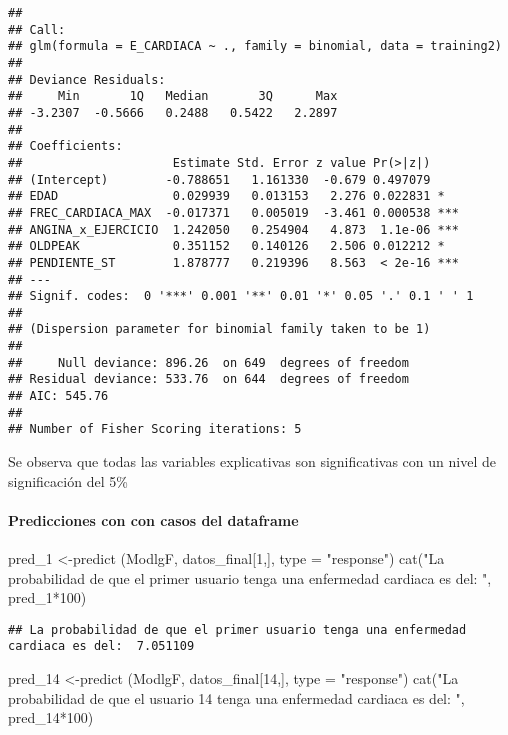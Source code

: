 \documentclass[
]{article}
\newenvironment{Shaded}{\begin{snugshade}}{\end{snugshade}}
\newcommand{\AttributeTok}[1]{\textcolor[rgb]{0.80,0.80,0.80}{#1}}
\newcommand{\DecValTok}[1]{\textcolor[rgb]{0.86,0.86,0.80}{#1}}
\newcommand{\FunctionTok}[1]{\textcolor[rgb]{0.94,0.94,0.56}{#1}}
\newcommand{\NormalTok}[1]{\textcolor[rgb]{0.80,0.80,0.80}{#1}}
\newcommand{\OtherTok}[1]{\textcolor[rgb]{0.94,0.94,0.56}{#1}}
\newcommand{\SpecialCharTok}[1]{\textcolor[rgb]{0.86,0.64,0.64}{#1}}
\newcommand{\StringTok}[1]{\textcolor[rgb]{0.80,0.58,0.58}{#1}}
\begin{document}
\begin{verbatim}
## 
## Call:
## glm(formula = E_CARDIACA ~ ., family = binomial, data = training2)
## 
## Deviance Residuals: 
##     Min       1Q   Median       3Q      Max  
## -3.2307  -0.5666   0.2488   0.5422   2.2897  
## 
## Coefficients:
##                     Estimate Std. Error z value Pr(>|z|)    
## (Intercept)        -0.788651   1.161330  -0.679 0.497079    
## EDAD                0.029939   0.013153   2.276 0.022831 *  
## FREC_CARDIACA_MAX  -0.017371   0.005019  -3.461 0.000538 ***
## ANGINA_x_EJERCICIO  1.242050   0.254904   4.873  1.1e-06 ***
## OLDPEAK             0.351152   0.140126   2.506 0.012212 *  
## PENDIENTE_ST        1.878777   0.219396   8.563  < 2e-16 ***
## ---
## Signif. codes:  0 '***' 0.001 '**' 0.01 '*' 0.05 '.' 0.1 ' ' 1
## 
## (Dispersion parameter for binomial family taken to be 1)
## 
##     Null deviance: 896.26  on 649  degrees of freedom
## Residual deviance: 533.76  on 644  degrees of freedom
## AIC: 545.76
## 
## Number of Fisher Scoring iterations: 5
\end{verbatim}

Se observa que todas las variables explicativas son significativas con
un nivel de significación del 5\%

\hypertarget{predicciones-con-con-casos-del-dataframe}{%
\paragraph{Predicciones con con casos del
dataframe}\label{predicciones-con-con-casos-del-dataframe}}

\begin{Shaded}
\begin{Highlighting}[]
\NormalTok{pred\_1 }\OtherTok{\textless{}{-}}\FunctionTok{predict}\NormalTok{ (ModlgF, datos\_final[}\DecValTok{1}\NormalTok{,], }\AttributeTok{type =} \StringTok{"response"}\NormalTok{)}
\FunctionTok{cat}\NormalTok{(}\StringTok{"La probabilidad de que el primer usuario tenga una enfermedad cardiaca es del: "}\NormalTok{, pred\_1}\SpecialCharTok{*}\DecValTok{100}\NormalTok{)}
\end{Highlighting}
\end{Shaded}

\begin{verbatim}
## La probabilidad de que el primer usuario tenga una enfermedad cardiaca es del:  7.051109
\end{verbatim}

\begin{Shaded}
\begin{Highlighting}[]
\NormalTok{pred\_14 }\OtherTok{\textless{}{-}}\FunctionTok{predict}\NormalTok{ (ModlgF, datos\_final[}\DecValTok{14}\NormalTok{,], }\AttributeTok{type =} \StringTok{"response"}\NormalTok{)}
\FunctionTok{cat}\NormalTok{(}\StringTok{"La probabilidad de que el usuario 14 tenga una enfermedad cardiaca es del: "}\NormalTok{, pred\_14}\SpecialCharTok{*}\DecValTok{100}\NormalTok{)}
\end{Highlighting}
\end{Shaded}
\end{document}
